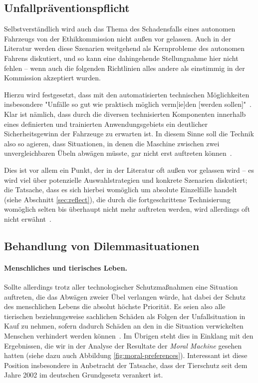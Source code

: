 \documentclass[twocolumn, german]{tum-article}
\begin{document}
\subsection{Unfallpräventionspflicht}
Selbstverständlich wird auch das Thema des Schadensfalls eines autonomen Fahrzeugs von der Ethikkommission nicht außen vor gelassen.
Auch in der Literatur werden diese Szenarien weitgehend als Kernprobleme des autonomen Fahrens diskutiert, und so kann eine dahingehende Stellungnahme hier nicht fehlen -- wenn auch die folgenden Richtlinien alles andere als einstimmig in der Kommission akzeptiert wurden.

Hierzu wird festgesetzt, dass mit den automatisierten technischen Möglichkeiten insbesondere "Unfälle so gut wie praktisch möglich verm[ie]den [werden sollen]"~\cite[S. 10]{ethik-komission}.
Klar ist nämlich, dass durch die diversen technisierten Komponenten innerhalb eines definierten und trainierten Anwendungsgebiets ein deutlicher Sicherheitsgewinn der Fahrzeuge zu erwarten ist.
In diesem Sinne soll die Technik also so agieren, dass Situationen, in denen die Maschine zwischen zwei unvergleichbaren Übeln abwägen müsste, gar nicht erst auftreten können~\cite[S. 10]{ethik-komission}.

Dies ist vor allem ein Punkt, der in der Literatur oft außen vor gelassen wird -- es wird viel über potenzielle Auswahlstrategien und konkrete Szenarien diskutiert; die Tatsache, dass es sich hierbei womöglich um absolute Einzelfälle handelt (siehe Abschnitt \vref{sec:reflect}), die durch die fortgeschrittene Technisierung womöglich selten bis überhaupt nicht mehr auftreten werden, wird allerdings oft nicht erwähnt~\cite[S. 551]{ethics-code}.


\subsection{Behandlung von Dilemmasituationen}
\paragraph{Menschliches und tierisches Leben.}
Sollte allerdings trotz aller technologischer Schutzmaßnahmen eine Situation auftreten, die das Abwägen zweier Übel verlangen würde, hat dabei der Schutz des menschlichen Lebens die absolut höchste Priorität.
Es seien also alle tierischen beziehungsweise sachlichen Schäden als Folgen der Unfallsituation in Kauf zu nehmen, sofern dadurch Schäden an den in die Situation verwickelten Menschen verhindert werden können~\cite[S. 11]{ethik-komission}.
Im Übrigen steht dies in Einklang mit den Ergebnissen, die wir in der Analyse der Resultate der \emph{Moral Machine} gesehen hatten (siehe dazu auch Abbildung \vref{fig:moral-preferences}).
Interessant ist diese Position insbesondere in Anbetracht der Tatsache, dass der Tierschutz seit dem Jahre 2002 im deutschen Grundgesetz verankert ist.
\end{document}
